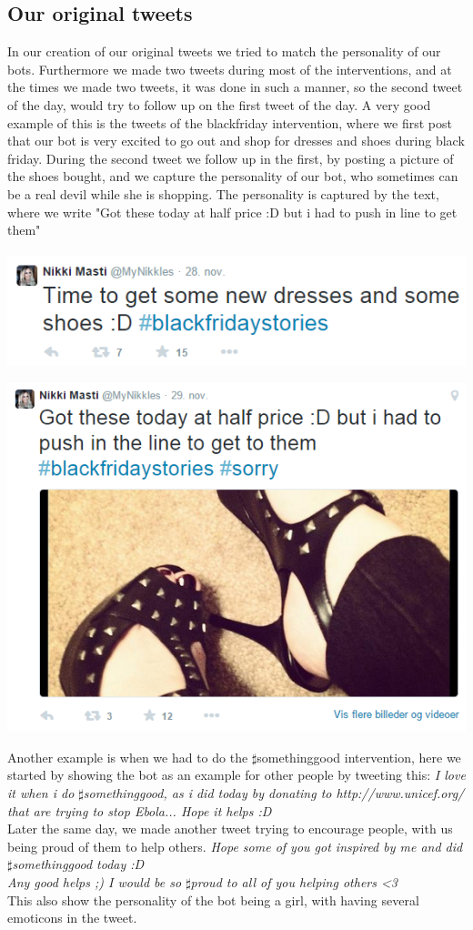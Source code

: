 \subsection{Our original tweets}
In our creation of our original tweets we tried to  match the personality of our bots. Furthermore we made two tweets during most of the interventions, and at the times we made two tweets, it was done in such a manner, so the second tweet of the day, would try to follow up on the first tweet of the day. A very good example of this is the tweets of the blackfriday intervention, where we first post that our bot is very excited to go out and shop for dresses and shoes during black friday. During the second tweet we follow up in the first, by posting a picture of the shoes bought, and we capture the personality of our bot, who sometimes can be a real devil while she is shopping. The personality is captured by the text, where we write "Got these today at half price :D but i had to push in line to get them" \\
\\
\includegraphics[scale=0.5]{intervention_blackfriday}

\includegraphics[scale=0.5]{intervention_blackfriday2}

Another example is when we had to do the $\sharp$somethinggood intervention, here we started by showing the bot as an example for other people by tweeting this:
\textit{I love it when i do $\sharp$somethinggood, as i did today by donating to http://www.unicef.org/ that are trying to stop Ebola... Hope it helps :D}
\\
Later the same day, we made another tweet trying to encourage people, with us being proud of them to help others.
\textit{Hope some of you got inspired by me and did $\sharp$somethinggood today :D\\
Any good helps ;) I would be so $\sharp$proud to all of you helping others <3}\\
This also show the personality of the bot being a girl, with having several emoticons in the tweet. 
